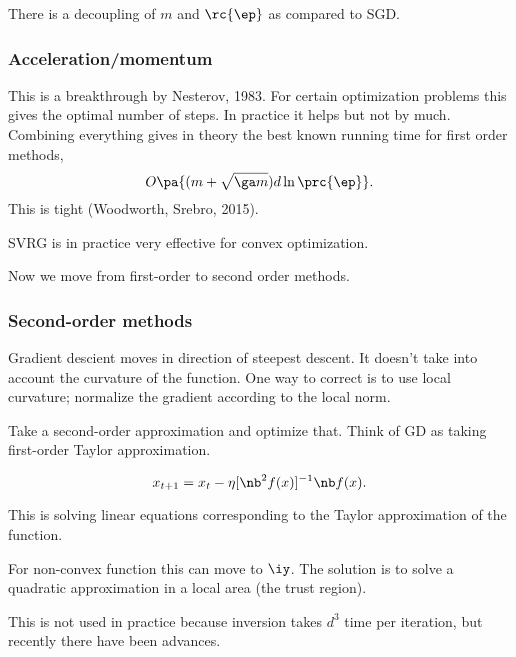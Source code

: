 There is a decoupling of $m$ and $\rc{\ep}$ as compared to SGD. 


\subsubsection{Acceleration/momentum}
This is a breakthrough by Nesterov, 1983. 
For certain optimization problems this gives the optimal number of steps. In practice it helps but not by much. Combining everything gives in theory the best known running time for first order methods,
$$
O\pa{(m+\sqrt{\ga m}) d\ln \prc{\ep}}.
$$
This is tight (Woodworth, Srebro, 2015).

SVRG is in practice very effective for convex optimization.

Now we move from first-order to second order methods.



\subsubsection{Second-order methods}
Gradient descient moves in direction of steepest descent.
It doesn't take into account the curvature of the function. One way to correct is to use local curvature; normalize the gradient according to the local norm. 

Take a second-order approximation and optimize that. Think of GD as taking first-order Taylor approximation.
\begin{alg}
$$
x_{t+1} = x_t - \eta[\nb^2f(x)]^{-1}\nb f(x).
$$
\end{alg}
This is solving linear equations corresponding to the Taylor approximation of the function.

For non-convex function this can move to $\iy$. The solution is to solve a quadratic approximation in a local area (the trust region).

This is not used in practice because inversion takes $d^3$ time per iteration, but recently there have been advances.

